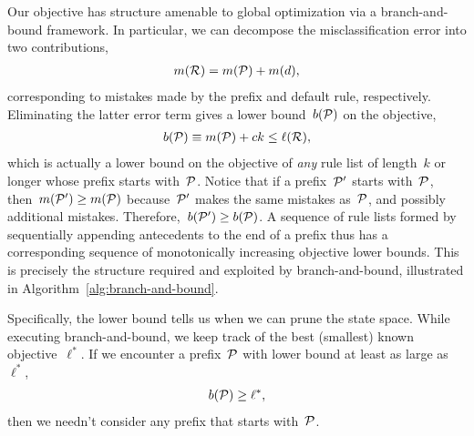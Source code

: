 Our objective has structure amenable to global optimization via a branch-and-bound framework.
%
In particular, we can decompose the misclassification error into two contributions, 
\begin{align}
m(\RL) = m(\Prefix) + m(d),
\end{align}
corresponding to mistakes made by the prefix and default rule, respectively.
%
Eliminating the latter error term gives a lower bound~$b({\mathcal P})$ on the objective,
\begin{align}
b(\Prefix) \equiv m(\Prefix) + c k \le \ell(\RL),
\label{eq:lower-bound}
\end{align}
which is actually a lower bound on the objective of \emph{any} rule list
of length~$k$ or longer whose prefix starts with~${\mathcal P}$.
%
Notice that if a prefix~${\mathcal P}'$ starts with~${\mathcal P}$, then~${m({\mathcal P}') \ge m({\mathcal P})}$
because~${\mathcal P}'$ makes the same mistakes as~${\mathcal P}$, and possibly additional mistakes.
%
Therefore,~${b({\mathcal P}') \ge b({\mathcal P})}$.
%
A sequence of rule lists formed by sequentially appending antecedents
to the end of a prefix thus has a corresponding sequence of
monotonically increasing objective lower bounds.
%
This is precisely the structure required and exploited by branch-and-bound,
illustrated in Algorithm~\ref{alg:branch-and-bound}.

Specifically, the lower bound tells us when we can prune the state space.
%
While executing branch-and-bound, we keep track of the best (smallest) known objective~$\ell^*$.
%
If we encounter a prefix~${\mathcal P}$ with lower bound at least as large as~$\ell^*$,
\begin{align}
b(\Prefix) \ge \ell^*,
\end{align}
then we needn't consider any prefix that starts with~${\mathcal P}$.

